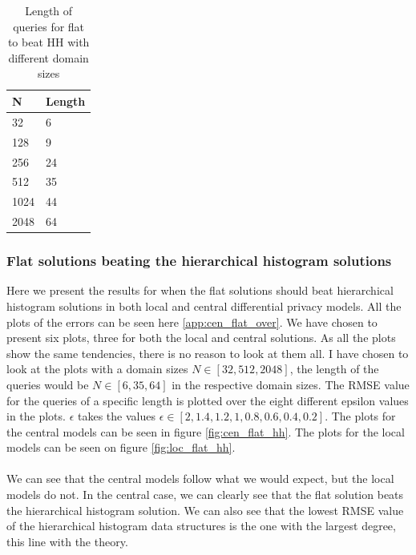 \documentclass[11pt]{article}
\theoremstyle{definition}
\begin{document}
\begin{table}[H]
\centering
\begin{tabular}{|l|l|}
\hline
N    &  Length     \\ \hline
32  & 6 \\ \hline
128  & 9 \\ \hline
256  & 24 \\ \hline
512  & 35        \\ \hline
1024 & 44         \\ \hline
2048 & 64         \\ \hline
\end{tabular}
\caption{Length of queries for flat to beat HH with different domain sizes}
\label{hh_v_flat}
\end{table}

\subsubsection{Flat solutions beating the hierarchical histogram solutions}
Here we present the results for when the flat solutions should beat hierarchical histogram solutions in both local and central differential privacy models. All the plots of the errors can be seen here \ref{app:cen_flat_over}. We have chosen to present six plots, three for both the local and central solutions. As all the plots show the same tendencies, there is no reason to look at them all. I have chosen to look at the plots with a domain sizes $N\in[32,512,2048]$, the length of the queries would be $N\in[6,35,64]$ in the respective domain sizes. The RMSE value for the queries of a specific length is plotted over the eight different epsilon values in the plots. $\epsilon$ takes the values $\epsilon\in[2, 1.4, 1.2, 1, 0.8, 0.6, 0.4, 0.2]$.  The plots for the central models can be seen in figure \ref{fig:cen_flat_hh}. The plots for the local models can be seen on figure \ref{fig:loc_flat_hh}. \\ \\
We can see that the central models follow what we would expect, but the local models do not. In the central case, we can clearly see that the flat solution beats the hierarchical histogram solution. We can also see that the lowest RMSE value of the hierarchical histogram data structures is the one with the largest degree, this line with the theory.\\ \\
\end{document}
